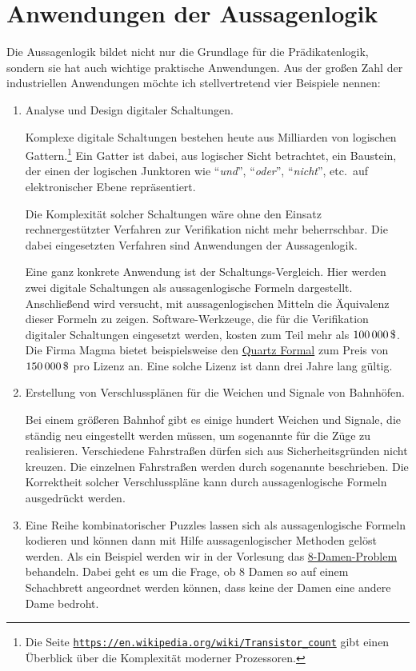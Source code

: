 \section{Anwendungen der Aussagenlogik}
Die Aussagenlogik bildet nicht nur die Grundlage für die Prädikatenlogik, sondern sie hat auch wichtige prak\-tische
Anwendungen.  Aus der großen Zahl der industriellen Anwendungen möchte ich stellvertretend vier Beispiele nennen:
\begin{enumerate}
\item Analyse und Design digitaler Schaltungen.

      Komplexe digitale Schaltungen bestehen heute aus Milliarden von logischen Gattern.\footnote{Die Seite 
      \href{https://en.wikipedia.org/wiki/Transistor_count}{\texttt{https://en.wikipedia.org/wiki/Transistor\_count}}
      gibt einen Überblick über die Komplexität moderner Prozessoren.}
      Ein Gatter ist dabei, aus logischer Sicht betrachtet, ein Baustein, der einen
      der logischen Junktoren wie ``\textsl{und}'', ``\textsl{oder}'', ``\textsl{nicht}'',
      etc.~auf elektronischer Ebene repräsentiert. 
  
      Die Komplexität solcher Schaltungen wäre ohne den Einsatz
      rechnergestützter Verfahren zur Verifikation nicht mehr beherrschbar.  Die
      dabei eingesetzten Verfahren sind Anwendungen der Aussagenlogik. 

      Eine ganz konkrete Anwendung ist der Schaltungs-Vergleich.  Hier werden zwei
      digitale Schaltungen als aussagenlogische Formeln dargestellt.
      Anschließend wird versucht, mit aussagenlogischen Mitteln die Äquivalenz dieser
      Formeln zu zeigen. Software-Werkzeuge, die für die Verifikation digitaler
      Schaltungen eingesetzt werden, kosten zum Teil mehr als $100\,000\,\symbol{36}$.
      Die Firma Magma bietet beispielsweise den 
      \href{https://www.eetimes.com/document.asp?doc_id=1217672}{Quartz Formal} zum Preis
      von $150\,000\,
      \symbol{36}$ pro Lizenz an.  Eine solche Lizenz ist dann drei Jahre lang gültig.
\item Erstellung von Verschlussplänen für die Weichen und Signale von Bahnhöfen.

      Bei einem größeren Bahnhof gibt es einige hundert Weichen und Signale, die ständig
      neu eingestellt werden müssen, um sogenannte  für die Züge zu
      realisieren.  Verschiedene Fahrstraßen dürfen sich aus Sicherheitsgründen nicht kreuzen.  
      Die einzelnen Fahrstraßen werden durch sogenannte  beschrieben.
      Die Korrektheit solcher Verschlusspläne kann durch aussagenlogische Formeln ausgedrückt werden.
\item Eine Reihe kombinatorischer Puzzles lassen sich als aussagenlogische Formeln
      kodieren und können dann mit Hilfe aussagenlogischer Methoden gelöst werden.  Als ein
      Beispiel werden wir in der Vorlesung das 
      \href{https://en.wikipedia.org/wiki/Eight_queens_puzzle}{8-Damen-Problem} behandeln.  Dabei
      geht es um die Frage, ob 8 Damen so auf einem Schachbrett angeordnet werden können, dass
      keine der Damen eine andere Dame bedroht.
\end{enumerate}

